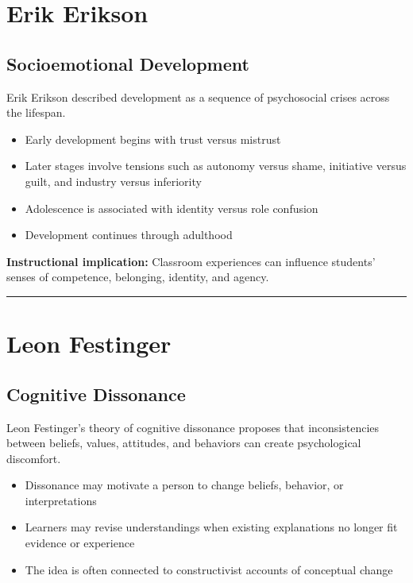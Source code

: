 \documentclass[
  letterpaper,
  DIV=11,
  numbers=noendperiod]{scrartcl}
\providecommand{\tightlist}{%
  \setlength{\itemsep}{0pt}\setlength{\parskip}{0pt}}\usepackage{longtable,booktabs,array}
\begin{document}
\section{Erik Erikson}\label{erik-erikson}

\subsection{Socioemotional
Development}\label{socioemotional-development}

Erik Erikson described development as a sequence of psychosocial crises
across the lifespan.

\begin{itemize}
\tightlist
\item
  Early development begins with trust versus mistrust
\item
  Later stages involve tensions such as autonomy versus shame,
  initiative versus guilt, and industry versus inferiority
\item
  Adolescence is associated with identity versus role confusion
\item
  Development continues through adulthood
\end{itemize}

\textbf{Instructional implication:} Classroom experiences can influence
students' senses of competence, belonging, identity, and agency.

\begin{center}\rule{0.5\linewidth}{0.5pt}\end{center}

\section{Leon Festinger}\label{leon-festinger}

\subsection{Cognitive Dissonance}\label{cognitive-dissonance}

Leon Festinger's theory of cognitive dissonance proposes that
inconsistencies between beliefs, values, attitudes, and behaviors can
create psychological discomfort.

\begin{itemize}
\tightlist
\item
  Dissonance may motivate a person to change beliefs, behavior, or
  interpretations
\item
  Learners may revise understandings when existing explanations no
  longer fit evidence or experience
\item
  The idea is often connected to constructivist accounts of conceptual
  change
\end{itemize}
\end{document}

